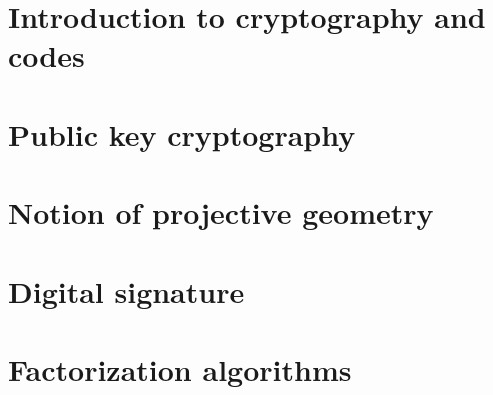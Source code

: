 \documentclass{lectures2}
\begin{document}
    \maketitle

    \section{Introduction to cryptography and codes}
    

    \section{Public key cryptography}
    

    \section{Notion of projective geometry}
    

    \section{Digital signature}
    

    \section{Factorization algorithms}
    

    \nocite{*}
    \printbibliography
\end{document}
